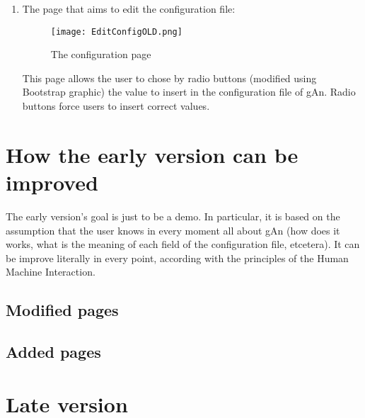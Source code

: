 \begin{enumerate}
\item The page that aims to edit the configuration file:

\begin{figure}[H]
\centering
\texttt{[image: EditConfigOLD.png]} %
\caption{The configuration page}
\end{figure}   

This page allows the user to chose by radio buttons (modified using Bootstrap graphic) the value to insert in the configuration file of gAn. Radio buttons force users to insert correct values.    

\end{enumerate}

\section{How the early version can be improved}
The early version's goal is just to be a demo. In particular, it is based on the assumption that the user knows in every moment all about gAn (how does it works,  what is the meaning of each field of the configuration file, etcetera). It can be improve literally in every point, according with the principles of the Human Machine Interaction.

\subsection{Modified pages}

\subsection{Added pages}

\section{Late version}
